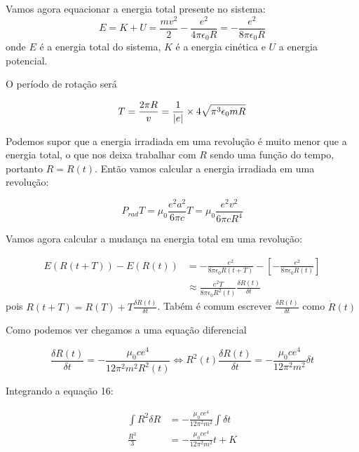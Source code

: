 \documentclass[12pt, letterpaper]{article}
\begin{document}
    Vamos agora equacionar a energia total presente no sistema:
    \begin{equation}
        E = K + U = \frac{mv^2}{2} - \frac{e^2}{4\pi\epsilon_0R} = -\frac{e^2}{8\pi\epsilon_0R}
    \end{equation}
    onde $E$ é a energia total do sistema, $K$ é a energia cinética e $U$ a energia potencial.

    O período de rotação será

    \begin{equation}
        T = \frac{2\pi R}{v} = \frac{1}{\abs{e}}\times4\sqrt{\pi^3\epsilon_0mR}
    \end{equation}

    Podemos supor que a energia irradiada em uma revolução é muito menor que a energia total, o que nos deixa trabalhar com $R$ sendo uma função do tempo, portanto $R = R(t)$. Então vamos calcular a energia irradiada em uma revolução:

    \begin{equation}
        P_{rad}T = \mu_0\frac{e^2a^2}{6\pi c}T = \mu_0\frac{e^2v^2}{6\pi cR^4}
    \end{equation}

    Vamos agora calcular a mudança na energia total em uma revolução:

    \begin{equation}
    \begin{split}
        E(R(t + T)) - E(R(t)) &= -\frac{e^2}{8\pi\epsilon_0R(t + T)} - [-\frac{e^2}{8\pi\epsilon_0R(t)}] \\
        &\approx \frac{e^2T}{8\pi\epsilon_0R^2(t)}\frac{\delta R(t)}{\delta t}
    \end{split}
    \end{equation}
    pois $R(t + T) = R(T) + T\frac{\delta R(t)}{\delta t}$. Tabém é comum escrever $\frac{\delta R(t)}{\delta t}$ como $\dot{R}(t)$

    Como podemos ver chegamos a uma equação diferencial

    \begin{equation}
        \frac{\delta R(t)}{\delta t} = -\frac{\mu_0ce^4}{12\pi^2m^2R^2(t)} \Leftrightarrow R^2(t)\frac{\delta R(t)}{\delta t} = -\frac{\mu_0ce^4}{12\pi^2m^2}\delta t
    \end{equation}

    \newpage
    Integrando a equação 16:

    \begin{equation}
    \begin{split}
        \int R^2\delta R &= -\frac{\mu_0ce^4}{12\pi^2m^2} \int\delta t \\
        \frac{R^3}{3} &= -\frac{\mu_0ce^4}{12\pi^2m^2}t + K
    \end{split}
    \end{equation}
\end{document}

